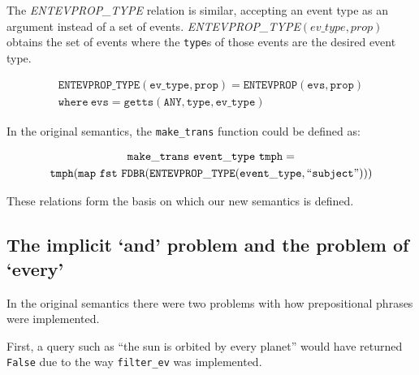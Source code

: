 \documentclass[../main.tex]{subfiles}
\begin{document}
The {\em ENTEVPROP\_TYPE} relation is similar, accepting an event type as an argument instead of a set of events.
{\em ENTEVPROP\_TYPE}$(ev\_type, prop)$ obtains the set of events where the \texttt{type}s of those events are the desired event type.


\begin{definition}
	\begin{multline*}
	\mathtt{ENTEVPROP\_TYPE}(\mathtt{ev\_type}, \mathtt{prop}) = \mathtt{ENTEVPROP}(\mathtt{evs}, \mathtt{prop}) \\ \mathtt{where} \ \mathtt{evs} = \mathtt{getts}(\mathtt{ANY}, \mathtt{type}, \mathtt{ev\_type})
	\end{multline*}
\end{definition}

In the original semantics, the \texttt{make\_trans} function could be defined as:

\begin{multline*}
  \mathtt{make\_trans} \ \mathtt{event\_type}\ \mathtt{tmph} = \\ \mathtt{tmph} (\mathtt{map} \ \mathtt{fst}\ \mathtt{FDBR}(\mathtt{ENTEVPROP\_TYPE}(\mathtt{event\_type}, \text{``\texttt{subject}''})))
\end{multline*}

These relations form the basis on which our new semantics is defined.

\subsection{The implicit `and' problem and the problem of `every'}

In the original semantics there were two problems with how prepositional phrases were implemented.

First, a query such as ``the sun is orbited by every planet'' would have returned \texttt{False} due to the way \texttt{filter\_ev} was implemented.
\end{document}
